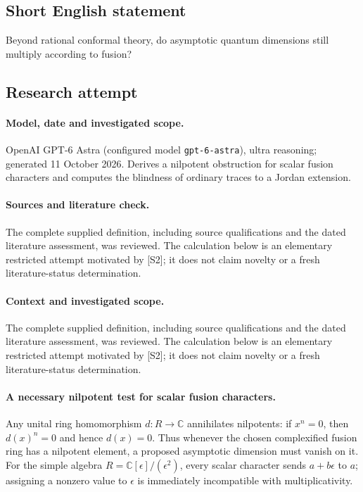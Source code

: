 \documentclass[11pt]{article}
\begin{document}
\subsection{Short English statement}
Beyond rational conformal theory, do asymptotic quantum dimensions still multiply according to fusion?
\subsection{Research attempt}
\paragraph{Model, date and investigated scope.}
OpenAI GPT-6 Astra (configured model \texttt{gpt-6-astra}), ultra reasoning; generated 11 October 2026. Derives a nilpotent obstruction for scalar fusion characters and computes the blindness of ordinary traces to a Jordan extension.

\paragraph{Sources and literature check.}
The complete supplied definition, including source qualifications and the dated literature assessment, was reviewed. The calculation below is an elementary restricted attempt motivated by [S2]; it does not claim novelty or a fresh literature-status determination.

\paragraph{Context and investigated scope.} The complete supplied definition, including source qualifications and the dated literature assessment, was reviewed. The calculation below is an elementary restricted attempt motivated by [S2]; it does not claim novelty or a fresh literature-status determination.

\paragraph{A necessary nilpotent test for scalar fusion characters.} Any unital ring homomorphism $d:R\to\mathbb C$ annihilates nilpotents: if $x^n=0$, then $d(x)^n=0$ and hence $d(x)=0$. Thus whenever the chosen complexified fusion ring has a nilpotent element, a proposed asymptotic dimension must vanish on it. For the simple algebra $R=\mathbb C[\epsilon]/(\epsilon^2)$, every scalar character sends $a+b\epsilon$ to $a$; assigning a nonzero value to $\epsilon$ is immediately incompatible with multiplicativity.
\end{document}

